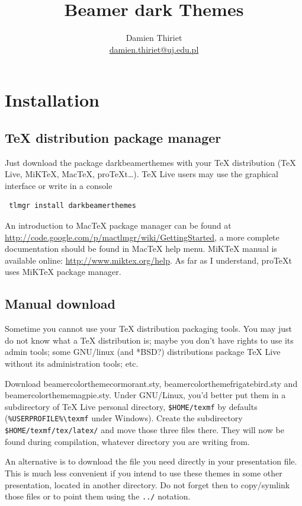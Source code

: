 \documentclass[12pt]{article}
\title{Beamer dark Themes}
\author{Damien Thiriet \\ \url{damien.thiriet@uj.edu.pl}}
\begin{document}
\maketitle
\tableofcontents

\section{Installation}

\subsection{TeX{} distribution package manager}

Just download the package \ttfamily darkbeamerthemes \rmfamily  with your \TeX{} distribution (\TeX{} Live, MiK\TeX{}, Mac\TeX{}, pro\TeX{}t…).
\TeX{} Live users may use the graphical interface or write in a console
\begin{verbatim}
 tlmgr install darkbeamerthemes
\end{verbatim}
An introduction to Mac\TeX{} package manager can be found at \url{http://code.google.com/p/mactlmgr/wiki/GettingStarted}, a more complete documentation should be found in Mac\TeX{} help menu.
MiK\TeX{} manual is available online: \url{http://www.miktex.org/help}.
As far as I understand, pro\TeX{}t uses MiK\TeX{} package manager.

\subsection{Manual download}

Sometime you cannot use your \TeX{} distribution packaging tools. You may just
do not know what a \TeX{} distribution is; maybe you don't have rights to use its admin tools; some GNU/linux (and *BSD?) distributions package \TeX{} Live without its administration tools; etc. 

Download \ttfamily beamercolorthemecormorant.sty, beamercolorthemefrigatebird.sty \rmfamily{} and \rmfamily{}  beamercolorthememagpie.sty. \rmfamily Under GNU/Linux, you'd better put them in a subdirectory of \TeX{} Live personal directory, \verb+$HOME/texmf+ by defaults (\verb+%USERPROFILE%\texmf+ under Windows). 
Create the subdirectory \verb+$HOME/texmf/tex/latex/+ and move those three files there. They will now be found during compilation, whatever directory you are writing from.

An alternative is to download the file you need directly in your presentation file. This is much less convenient if you intend to use these themes in some other presentation, located in another directory. Do not forget then to copy/symlink those files or to point them using the \verb+../+ notation.
\end{document}
